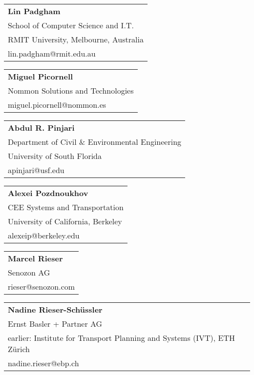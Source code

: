 \begin{tabular}[width=0.48\textwidth]{@{}l}
\textbf{Lin Padgham} \\
School of Computer Science and I.T. \\
RMIT University, Melbourne, Australia \\
lin.padgham@rmit.edu.au \\
\end{tabular}

\begin{tabular}[width=0.48\textwidth]{@{}l}
\textbf{Miguel Picornell} \\
Nommon Solutions and Technologies \\
miguel.picornell@nommon.es \\
\end{tabular}

\begin{tabular}[width=0.48\textwidth]{@{}l}
\textbf{Abdul R. Pinjari} \\
Department of Civil \& Environmental Engineering \\
University of South Florida \\
apinjari@usf.edu \\
\end{tabular}

\begin{tabular}[width=0.48\textwidth]{@{}l}
\textbf{Alexei Pozdnoukhov} \\
CEE Systems and Transportation \\
University of California, Berkeley \\
alexeip@berkeley.edu \\
\end{tabular}

\begin{tabular}[width=0.48\textwidth]{@{}l}
\textbf{Marcel Rieser} \\
Senozon AG \\
rieser@senozon.com \\
\end{tabular}

\begin{tabular}[width=0.48\textwidth]{@{}l}
\textbf{Nadine Rieser-Schüssler} \\
Ernst Basler + Partner AG \\
earlier: Institute for Transport Planning and Systems (IVT), ETH Zürich \\
nadine.rieser@ebp.ch \\
\end{tabular}

